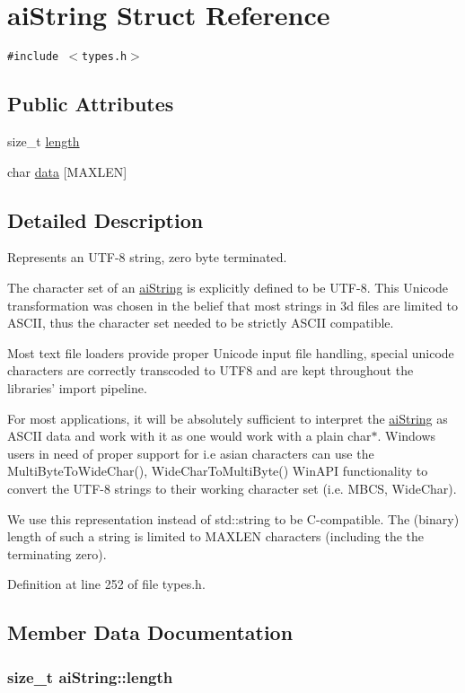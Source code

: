 \hypertarget{structai_string}{
\section{aiString Struct Reference}
\label{structai_string}
}
{\tt \#include $<$types.h$>$}

\subsection*{Public Attributes}
\begin{CompactItemize}
\item 
size\_\-t \hyperlink{structai_string_7d77c2031ff0340746aa046f7fbcf313}{length}
\item 
char \hyperlink{structai_string_a90b1da7d347a3dcca0a95061e6ea41d}{data} \mbox{[}MAXLEN\mbox{]}
\end{CompactItemize}


\subsection{Detailed Description}
Represents an UTF-8 string, zero byte terminated.

The character set of an \hyperlink{structai_string}{aiString} is explicitly defined to be UTF-8. This Unicode transformation was chosen in the belief that most strings in 3d files are limited to ASCII, thus the character set needed to be strictly ASCII compatible.

Most text file loaders provide proper Unicode input file handling, special unicode characters are correctly transcoded to UTF8 and are kept throughout the libraries' import pipeline.

For most applications, it will be absolutely sufficient to interpret the \hyperlink{structai_string}{aiString} as ASCII data and work with it as one would work with a plain char$\ast$. Windows users in need of proper support for i.e asian characters can use the MultiByteToWideChar(), WideCharToMultiByte() WinAPI functionality to convert the UTF-8 strings to their working character set (i.e. MBCS, WideChar).

We use this representation instead of std::string to be C-compatible. The (binary) length of such a string is limited to MAXLEN characters (including the the terminating zero). 

Definition at line 252 of file types.h.

\subsection{Member Data Documentation}
\hypertarget{structai_string_7d77c2031ff0340746aa046f7fbcf313}{
\subsubsection[length]{\setlength{\rightskip}{0pt plus 5cm}size\_\-t {\bf aiString::length}}}
\label{structai_string_7d77c2031ff0340746aa046f7fbcf313}



